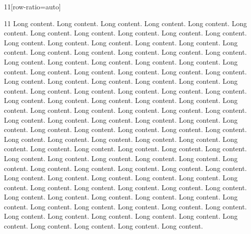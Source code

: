 \documentclass[paper={80mm,80mm}]{ropas-poster}
\begin{document}
\begin{postergrid}{1}{1}[row-ratio={auto}]
\begin{posterblock}{1}{1}
Long content. Long content. Long content. Long content. Long content. Long content. Long content. Long content. Long content. Long content. Long content. Long content. Long content. Long content. Long content. Long content. Long content. Long content. Long content. Long content. Long content. Long content. Long content. Long content. Long content. Long content. Long content. Long content. Long content. Long content. Long content. Long content. Long content. Long content. Long content. Long content. Long content. Long content. Long content. Long content. Long content. Long content. Long content. Long content. Long content. Long content. Long content. Long content. Long content. Long content. Long content. Long content. Long content. Long content. Long content. Long content. Long content. Long content. Long content. Long content. Long content. Long content. Long content. Long content. Long content. Long content. Long content. Long content. Long content. Long content. Long content. Long content. Long content. Long content. Long content. Long content. Long content. Long content. Long content. Long content. Long content. Long content. Long content. Long content. Long content. Long content. Long content. Long content. Long content. Long content. Long content. Long content. Long content. Long content. Long content. Long content. Long content. Long content. Long content. Long content. Long content. Long content. Long content. Long content. Long content. Long content. Long content. Long content. Long content. Long content. Long content. Long content. Long content. Long content. Long content. Long content. Long content. Long content. Long content. Long content. 
\end{posterblock}
\end{postergrid}
\end{document}
